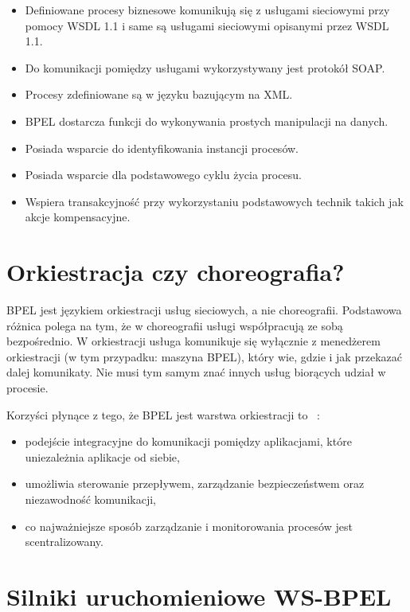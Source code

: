 \begin{itemize}
\item Definiowane procesy biznesowe komunikują się z usługami sieciowymi przy pomocy WSDL 1.1 i same są usługami sieciowymi opisanymi przez WSDL 1.1.  
\item Do komunikacji pomiędzy usługami wykorzystywany jest protokół SOAP.
\item Procesy zdefiniowane są w języku bazującym na XML.
\item BPEL dostarcza funkcji do wykonywania prostych manipulacji na danych.
\item Posiada wsparcie do identyfikowania instancji procesów.
\item Posiada wsparcie dla podstawowego cyklu życia procesu.
\item Wspiera transakcyjność przy wykorzystaniu podstawowych technik takich jak akcje kompensacyjne.
\end{itemize}


\section{Orkiestracja czy choreografia?}
\label{sec:bpelOrchestration}
BPEL jest językiem orkiestracji usług sieciowych, a nie choreografii. Podstawowa różnica polega na tym, że w choreografii usługi współpracują ze sobą bezpośrednio. W orkiestracji usługa komunikuje się wyłącznie z menedżerem orkiestracji (w tym przypadku: maszyna BPEL), który wie, gdzie i jak przekazać dalej komunikaty. Nie musi tym samym znać innych usług biorących udział w procesie. 

Korzyści płynące z tego, że BPEL jest warstwa orkiestracji to ~\cite{wiao}:

\begin{itemize}
\item podejście integracyjne do komunikacji pomiędzy aplikacjami, które uniezależnia aplikacje od siebie,  
\item umożliwia sterowanie przepływem, zarządzanie bezpieczeństwem oraz niezawodność komunikacji,
\item co najważniejsze sposób zarządzanie i monitorowania procesów jest scentralizowany. 
\end{itemize}


\section{Silniki uruchomieniowe WS-BPEL}
\label{sec:bpelEngines}

